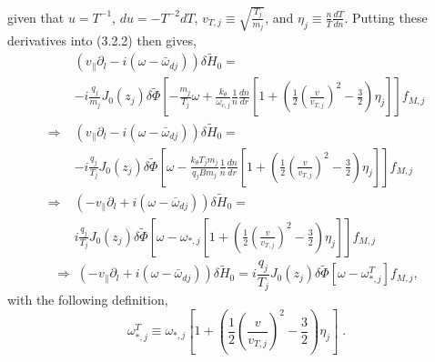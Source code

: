 \documentclass[12pt]{article}
\numberwithin{equation}{subsection}
\begin{document}
given that $u = T^{-1}$, $du = -T^{-2}dT$, $v_{T,j} \equiv \sqrt{\frac{T_j}{m_j}}$, and $\eta_j \equiv \frac{n}{T}\frac{dT}{dn}$. Putting these
derivatives into (3.2.2) then gives,
   \begin{equation}
   \begin{aligned}
      &(v_\parallel\partial_l - i(\omega - \bar{\omega}_{dj}))\delta\widetilde{H}_0 =               \\ &-i\frac{q_j}{m_j}J_0(z_j)\delta\widetilde{\Phi}
          [-\frac{m_j}{T_j}\omega + \frac{k_\theta}{\omega_{c,j}}\frac{1}{n}\frac{dn}{dr}[1 + (\frac{1}{2}\left(\frac{v}{v_{T,j}}\right)^2 - \frac{3}{2})\eta_j]]f_{M,j} \\
      \Rightarrow\; &(v_\parallel\partial_l - i(\omega - \bar{\omega}_{dj}))\delta\widetilde{H}_0 = \\ &-i\frac{q_j}{T_j}J_0(z_j)\delta\widetilde{\Phi}
          [\omega - \frac{k_\theta T_j m_j}{q_j B m_j}\frac{1}{n}\frac{dn}{dr}[1 + (\frac{1}{2}\left(\frac{v}{v_{T,j}}\right)^2 - \frac{3}{2})\eta_j]]f_{M,j}           \\
      \Rightarrow\; &(-v_\parallel\partial_l + i(\omega - \bar{\omega}_{dj}))\delta\widetilde{H}_0 = \\ &i\frac{q_j}{T_j}J_0(z_j)\delta\widetilde{\Phi}
          [\omega - \omega_{*,j}[1 + (\frac{1}{2}\left(\frac{v}{v_{T,j}}\right)^2- \frac{3}{2})\eta_j]]f_{M,j}
   \end{aligned}
   \end{equation}
   \begin{equation}
      \Rightarrow\; (-v_\parallel\partial_l + i(\omega - \bar{\omega}_{dj}))\delta\widetilde{H}_0
      = i\frac{q_j}{T_j}J_0(z_j)\delta\widetilde{\Phi}[\omega - \omega_{*,j}^T]f_{M,j},
   \end{equation}
with the following definition,
   \begin{equation}
      \omega_{*,j}^T \equiv \omega_{*,j}[1 + (\frac{1}{2}\left(\frac{v}{v_{T,j}}\right)^2-\frac{3}{2})\eta_j]\;.
   \end{equation}
\end{document}
